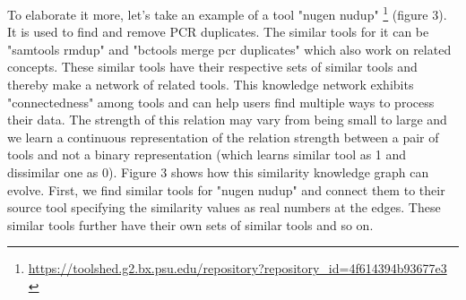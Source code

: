 To elaborate it more, let's take an example of a tool "nugen nudup" \footnote{\url{ https://toolshed.g2.bx.psu.edu/repository?repository_id=4f614394b93677e3 }} (figure 3). It is used to find and remove PCR duplicates. The similar tools for it can be "samtools rmdup" and "bctools merge pcr duplicates" which also work on related concepts. These similar tools have their respective sets of similar tools and thereby make a network of related tools. This knowledge network exhibits "connectedness" among tools and can help users find multiple ways to process their data. The strength of this relation may vary from being small to large and we learn a continuous representation of the relation strength between a pair of tools and not a binary representation (which learns similar tool as 1 and dissimilar one as 0). Figure 3 shows how this similarity knowledge graph can evolve. First, we find similar tools for "nugen nudup" and connect them to their source tool specifying the similarity values as real numbers at the edges. These similar tools further have their own sets of similar tools and so on.